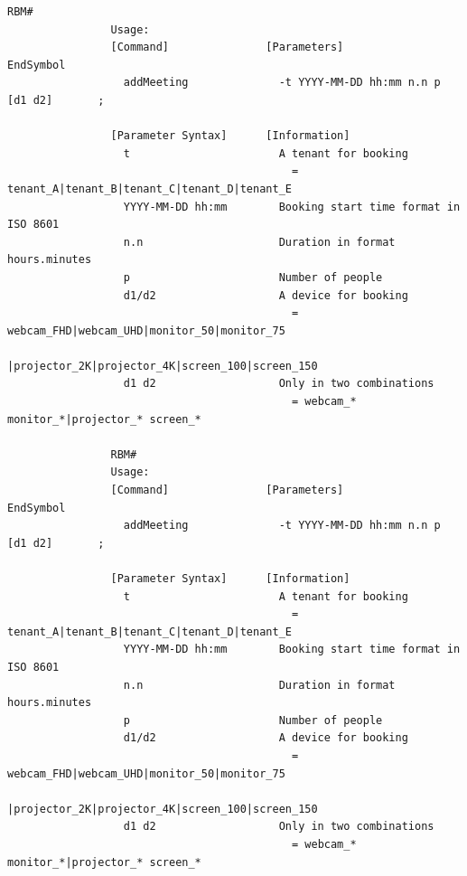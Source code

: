 \documentclass{article}
\begin{document}
\begin{Verbatim}[gobble=8]
                RBM#
                Usage: 
                [Command]               [Parameters]                            EndSymbol     
                  addMeeting              -t YYYY-MM-DD hh:mm n.n p [d1 d2]       ;           
                
                [Parameter Syntax]      [Information]                                         
                  t                       A tenant for booking                                
                                            = tenant_A|tenant_B|tenant_C|tenant_D|tenant_E    
                  YYYY-MM-DD hh:mm        Booking start time format in ISO 8601               
                  n.n                     Duration in format hours.minutes                    
                  p                       Number of people                                    
                  d1/d2                   A device for booking                                
                                            = webcam_FHD|webcam_UHD|monitor_50|monitor_75     
                                              |projector_2K|projector_4K|screen_100|screen_150
                  d1 d2                   Only in two combinations                            
                                            = webcam_* monitor_*|projector_* screen_*         
                
                RBM# 
                Usage: 
                [Command]               [Parameters]                            EndSymbol     
                  addMeeting              -t YYYY-MM-DD hh:mm n.n p [d1 d2]       ;           
                
                [Parameter Syntax]      [Information]                                         
                  t                       A tenant for booking                                
                                            = tenant_A|tenant_B|tenant_C|tenant_D|tenant_E    
                  YYYY-MM-DD hh:mm        Booking start time format in ISO 8601               
                  n.n                     Duration in format hours.minutes                    
                  p                       Number of people                                    
                  d1/d2                   A device for booking                                
                                            = webcam_FHD|webcam_UHD|monitor_50|monitor_75     
                                              |projector_2K|projector_4K|screen_100|screen_150
                  d1 d2                   Only in two combinations                            
                                            = webcam_* monitor_*|projector_* screen_*         
                

\end{Verbatim}
\end{document}
